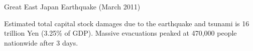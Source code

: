 \documentclass[serif, aspectratio=169]{beamer}
\begin{document}

\begin{frame}{Great East Japan Earthquake (March 2011)}








    \begin{minipage}{1.00\textwidth}
    \raggedright
    \begin{flushleft}
\begin{table}[h!]
\vspace{-0.7cm}
\raggedright
Estimated total capital stock damages due to the earthquake and tsunami is 16 trillion Yen (3.25\% of GDP). Massive evacuations peaked at 470,000 people nationwide after 3 days.


\end{table}
\end{flushleft}
\end{minipage}
\end{frame}
\end{document}
